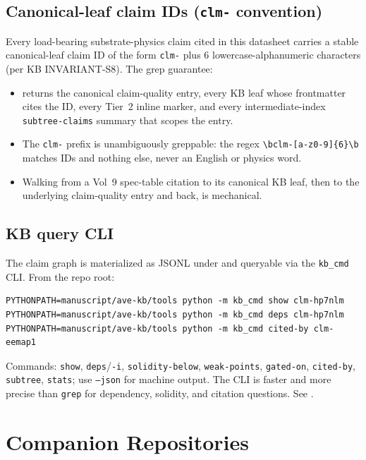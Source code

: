 \subsection{Canonical-leaf claim IDs (\texttt{clm-} convention)}

Every load-bearing substrate-physics claim cited in this datasheet carries a stable canonical-leaf claim ID of the form \texttt{clm-} plus 6 lowercase-alphanumeric characters (per KB INVARIANT-S8). The grep guarantee:

\begin{itemize}
    \item {} returns the canonical claim-quality entry, every KB leaf whose frontmatter cites the ID, every Tier~2 inline marker, and every intermediate-index \texttt{subtree-claims} summary that scopes the entry.
    \item The \texttt{clm-} prefix is unambiguously greppable: the regex \verb|\bclm-[a-z0-9]{6}\b| matches IDs and nothing else, never an English or physics word.
    \item Walking from a Vol~9 spec-table citation to its canonical KB leaf, then to the underlying claim-quality entry and back, is mechanical.
\end{itemize}

\subsection{KB query CLI}

The claim graph is materialized as JSONL under  and queryable via the \texttt{kb\_cmd} CLI. From the repo root:

\begin{verbatim}
PYTHONPATH=manuscript/ave-kb/tools python -m kb_cmd show clm-hp7nlm
PYTHONPATH=manuscript/ave-kb/tools python -m kb_cmd deps clm-hp7nlm
PYTHONPATH=manuscript/ave-kb/tools python -m kb_cmd cited-by clm-eemap1
\end{verbatim}

Commands: \texttt{show}, \texttt{deps}/\texttt{-i}, \texttt{solidity-below}, \texttt{weak-points}, \texttt{gated-on}, \texttt{cited-by}, \texttt{subtree}, \texttt{stats}; use \texttt{--json} for machine output. The CLI is faster and more precise than \texttt{grep} for dependency, solidity, and citation questions. See .

\section{Companion Repositories}
\label{sec:vol9_xref_companion}


